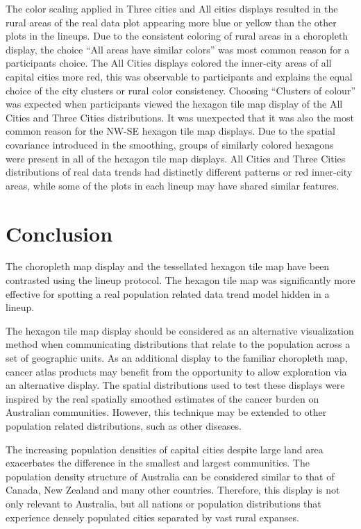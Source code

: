 \documentclass{monashthesis}
\begin{document}
The color scaling applied in Three cities and All cities displays resulted in the rural areas of the real data plot appearing more blue or yellow than the other plots in the lineups.
Due to the consistent coloring of rural areas in a choropleth display, the choice ``All areas have similar colors'' was most common reason for a participants choice. The All Cities displays colored the inner-city areas of all capital cities more red, this was observable to participants and explains the equal choice of the city clusters or rural color consistency.
Choosing ``Clusters of colour'' was expected when participants viewed the hexagon tile map display of the All Cities and Three Cities distributions. It was unexpected that it was also the most common reason for the NW-SE hexagon tile map displays.
Due to the spatial covariance introduced in the smoothing, groups of similarly colored hexagons were present in all of the hexagon tile map displays. All Cities and Three Cities distributions of real data trends had distinctly different patterns or red inner-city areas, while some of the plots in each lineup may have shared similar features.

\hypertarget{conclusion-04}{%
\section{Conclusion}\label{conclusion-04}}

The choropleth map display and the tessellated hexagon tile map have been contrasted using the lineup protocol. The hexagon tile map was significantly more effective for spotting a real population related data trend model hidden in a lineup.

The hexagon tile map display should be considered as an alternative visualization method when communicating distributions that relate to the population across a set of geographic units. As an additional display to the familiar choropleth map, cancer atlas products may benefit from the opportunity to allow exploration via an alternative display. The spatial distributions used to test these displays were inspired by the real spatially smoothed estimates of the cancer burden on Australian communities. However, this technique may be extended to other population related distributions, such as other diseases.

The increasing population densities of capital cities despite large land area exacerbates the difference in the smallest and largest communities.
The population density structure of Australia can be considered similar to that of Canada, New Zealand and many other countries. Therefore, this display is not only relevant to Australia, but all nations or population distributions that experience densely populated cities separated by vast rural expanses.
\end{document}
